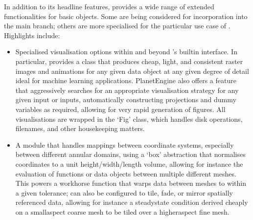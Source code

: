 \documentclass[letterpaper,10pt,english]{jupyterBook}
\begin{document}
\sphinxAtStartPar
In addition to its headline features,  provides a wide range of extended functionalities for basic  objects. Some are being considered for incorporation into the main  branch; others are more specialised for the particular use case of . Highlights include:
\begin{itemize}
\item {} 
\sphinxAtStartPar
Specialised visualisation options within and beyond ’s built\sphinxhyphen{}in  interface. In particular,  provides a class that produces cheap, light, and consistent raster images and animations for any given  data object at any given degree of detail \sphinxhyphen{} ideal for machine learning applications. PlanetEngine also offers a  feature that aggressively searches for an appropriate visualisation strategy for any given input or inputs, automatically constructing projections and dummy variables as required, allowing for very rapid generation of figures. All  visualisations are wrapped in the ‘Fig’ class, which handles disk operations, filenames, and other house\sphinxhyphen{}keeping matters.

\item {} 
\sphinxAtStartPar
A module that handles mappings between coordinate systems, especially between different annular domains, using a ‘box’ abstraction that normalises coordinates to a unit height/width/length volume, allowing \sphinxhyphen{} for instance \sphinxhyphen{} the evaluation of  functions or data objects between multiple different meshes. This powers a workhorse  function that warps data between meshes to within a given tolerance;  can also be configured to tile, fade, or mirror spatially referenced data, allowing \sphinxhyphen{} for instance \sphinxhyphen{} a steady\sphinxhyphen{}state condition derived cheaply on a small\sphinxhyphen{}aspect coarse mesh to be tiled over a higher\sphinxhyphen{}aspect fine mesh.


\end{itemize}
\end{document}
